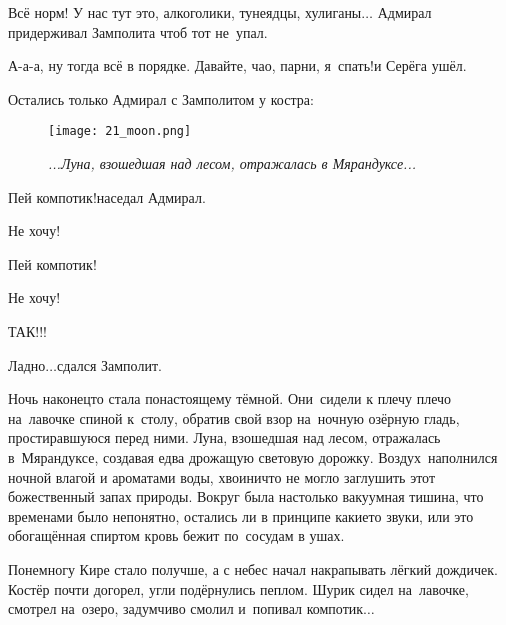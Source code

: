 \diagdash Всё норм! У нас тут это, алкоголики, тунеядцы, хулиганы$\ldots$ \mdash Адмирал придерживал Замполита чтоб тот не~упал.

\diagdash А-а-а, ну тогда всё в порядке. Давайте, чао, парни, я~спать!\mdash и Серёга ушёл.


Остались только Адмирал с Замполитом у костра: 

\setlength{\belowcaptionskip}{-10pt}
\begin{figure}[h]
	\centering
	\texttt{[image: 21\_moon.png]}
	\caption{\small\textit{...Луна, взошедшая над лесом, отражалась в Мярандуксе...}}
\end{figure}

\diagdash Пей компотик!\mdash наседал Адмирал.

\diagdash Не хочу!

\diagdash Пей компотик!

\diagdash Не хочу!

\diagdash ТАК!!!

\diagdash Ладно$\ldots$\mdash сдался Замполит.


Ночь наконец\sdash то стала по\sdash настоящему тёмной. Они~сидели к плечу плечо на~лавочке спиной к~столу, обратив свой взор на~ночную озёрную гладь, простиравшуюся перед ними. Луна, взошедшая над лесом, отражалась в~Мярандуксе, создавая едва дрожащую световую дорожку. Воздух~наполнился ночной влагой и ароматами воды, хвои\mdash ничто не могло заглушить этот божественный запах природы. Вокруг была настолько вакуумная тишина, что временами было непонятно, остались ли в принципе какие\sdash то звуки, или это обогащённая спиртом кровь бежит по~сосудам в ушах.



Понемногу Кире стало получше, а с небес начал накрапывать лёгкий дождичек. Костёр почти догорел, угли подёрнулись пеплом. Шурик сидел на~лавочке, смотрел на~озеро, задумчиво смолил и~попивал компотик$\ldots$



\begin{center}
\end{center}
